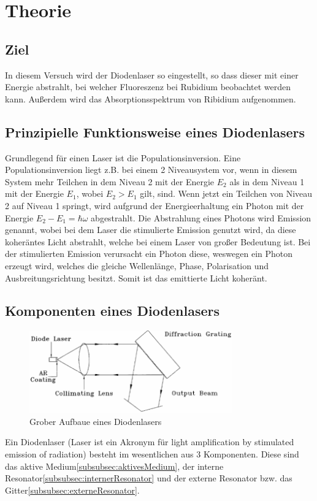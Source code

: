 \section{Theorie}
\label{sec:Theorie}
\subsection{Ziel}
\label{subsec:Ziel}
In diesem Versuch wird der Diodenlaser so eingestellt, so dass dieser mit einer Energie abstrahlt, bei welcher Fluoreszenz bei Rubidium beobachtet werden kann. 
Außerdem wird das Absorptionsspektrum von Ribidium aufgenommen.
\subsection{Prinzipielle Funktionsweise eines Diodenlasers}
\label{subsec:prinzipielleFunktionsweise}
Grundlegend für einen Laser ist die Populationsinversion. Eine Populationsinversion liegt z.B. bei einem 2 Niveausystem vor, wenn in diesem System mehr Teilchen
in dem Niveau 2 mit der Energie $E_2$ als in dem Niveau 1 mit der Energie $E_1$, wobei $E_2 > E_1$ gilt, sind.
Wenn jetzt ein Teilchen von Niveau 2 auf Niveau 1 springt, wird aufgrund der Energieerhaltung ein Photon mit der Energie $E_2 - E_1 = \hbar\omega$ abgestrahlt.
Die Abstrahlung eines Photons wird Emission genannt, wobei bei dem Laser die stimulierte Emission genutzt wird, da diese koheräntes Licht abstrahlt, welche bei einem Laser
von großer Bedeutung ist. 
Bei der stimulierten Emission verursacht ein Photon diese, weswegen ein Photon erzeugt wird, welches die gleiche Wellenlänge,
Phase, Polarisation und Ausbreitungsrichtung besitzt. 
Somit ist das emittierte Licht koheränt.
\subsection{Komponenten eines Diodenlasers}
\label{subsec:Komponenten}
\begin{figure}
    \centering
    \includegraphics[width = 0.78\textwidth]{pictures/komponenten.png}
    \caption{Grober Aufbaue eines Diodenlasers\cite{theorie}}
    \label{pic:theorie}
\end{figure}
Ein Diodenlaser (Laser ist ein Akronym für light amplification by stimulated emission of radiation) besteht im wesentlichen aus 3 Komponenten. 
Diese sind das aktive Medium\ref{subsubsec:aktivesMedium}, der interne Resonator\ref{subsubsec:internerResonator} 
und der externe Resonator bzw. das Gitter\ref{subsubsec:externeResonator}.

